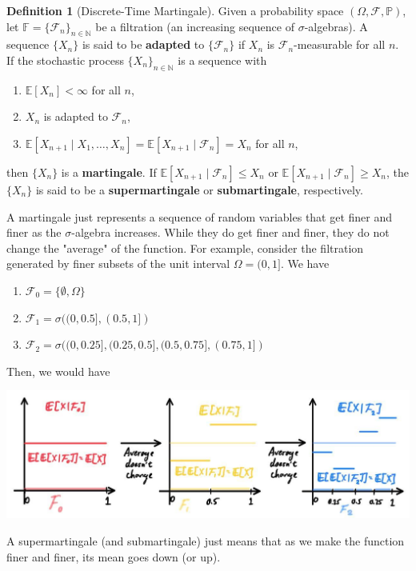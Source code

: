 \documentclass{article}
\theoremstyle{definition}
\theoremstyle{remark}
\theoremstyle{definition}
\newtheorem{definition}{Definition}[section]
\begin{document}
\begin{definition}[Discrete-Time Martingale]
Given a probability space $(\Omega, \mathcal{F}, \mathbb{P})$, let $\mathbb{F} = \{\mathcal{F}_n\}_{n \in \mathbb{N}}$ be a filtration (an increasing sequence of $\sigma$-algebras). A sequence $\{X_n\}$ is said to be \textbf{adapted} to $\{\mathcal{F}_n\}$ if $X_n$ is $\mathcal{F}_n$-measurable for all $n$. If the stochastic process $\{X_n\}_{n \in \mathbb{N}}$ is a sequence with 
\begin{enumerate}
    \item $\mathbb{E}[X_n] < \infty$ for all $n$, 
    \item $X_n$ is adapted to $\mathcal{F}_n$, 
    \item $\mathbb{E}[X_{n+1} \mid X_1, \ldots, X_n] = \mathbb{E}[X_{n+1} \mid \mathcal{F}_n] = X_n$ for all $n$, 
\end{enumerate}
then $\{X_n\}$ is a \textbf{martingale}. If $\mathbb{E}[X_{n+1} \mid \mathcal{F}_n] \leq X_n$ or $\mathbb{E}[X_{n+1} \mid \mathcal{F}_n] \geq X_n$, the $\{X_n\}$ is said to be a \textbf{supermartingale} or \textbf{submartingale}, respectively. 
\end{definition}

A martingale just represents a sequence of random variables that get finer and finer as the $\sigma$-algebra increases. While they do get finer and finer, they do not change the "average" of the function. For example, consider the filtration generated by finer subsets of the unit interval $\Omega = (0, 1]$. We have 
\begin{enumerate}
    \item $\mathcal{F}_0 = \{\emptyset, \Omega\}$ 
    \item $\mathcal{F}_1 = \sigma( (0, 0.5], (0.5, 1])$ 
    \item $\mathcal{F}_2 = \sigma( (0, 0.25], (0.25, 0.5], (0.5, 0.75], (0.75, 1] )$
\end{enumerate}
Then, we would have 
\begin{center}
    \includegraphics[scale=0.3]{img/martingale_increments.jpg}
\end{center}
A supermartingale (and submartingale) just means that as we make the function finer and finer, its mean goes down (or up). 
\end{document}
